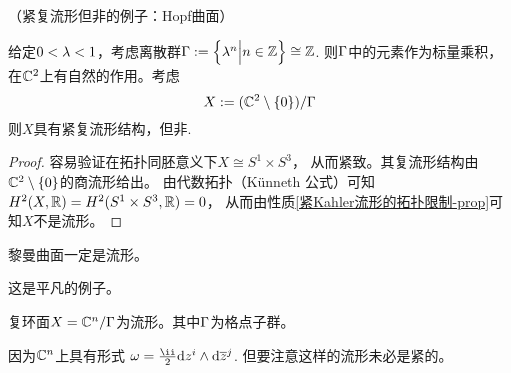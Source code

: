 
\begin{example}（紧复流形但非\Kahler 的例子：Hopf曲面）

给定$0<\lambda<1$，考虑离散群$\Gamma:=\Big\{ \lambda^n \Big| n\in\mathbb{Z} \Big\}\cong\mathbb{Z}$.
则$\Gamma$中的元素作为标量乘积，在$\mathbb{C}^2$上有自然的作用。考虑
$$X:=(\mathbb{C}^2\setminus\{0\})/\Gamma$$
则$X$具有紧复流形结构，但非\Kahler .
\end{example}

\begin{proof}
容易验证在拓扑同胚意义下$X\cong S^1\times S^3$，
从而紧致。其复流形结构由$\mathbb{C}^2\setminus\{0\}$的商流形给出。
由代数拓扑（K\"{u}nneth 公式）可知
$H^2(X,\mathbb{R})=H^2(S^1\times S^3,\mathbb{R})=0$，
从而由性质\ref{紧Kahler流形的拓扑限制-prop}可知$X$不是\Kahler 流形。
\end{proof}


\begin{example}
黎曼曲面一定是\Kahler 流形。
\end{example}

这是平凡的例子。

\begin{example}
复环面$X=\mathbb{C}^n/\Gamma$为\Kahler 流形。其中$\Gamma$为格点子群。
\end{example}
因为$\mathbb{C}^n$上具有\Kahler 形式
$\omg=\frac{\ii}{2}\td z^i\wedge\td\zbar^j$.
但要注意这样的流形未必是紧的。

